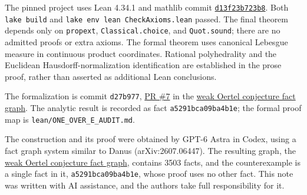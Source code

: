 \documentclass[10pt,letterpaper]{article}
\newcommand{\head}[1]{\vspace{5pt}{\large\bfseries\color{ink}#1}\par}
\begin{document}
The pinned project uses Lean 4.34.1 and mathlib commit
\href{https://github.com/leanprover-community/mathlib4/commit/d13f23b723b8a846827a245b89c10fc7d3f11612}{\texttt{d13f23b723b8}}. Both
\texttt{lake build} and \texttt{lake env lean CheckAxioms.lean} passed.
The final theorem depends only on \texttt{propext}, \texttt{Classical.choice},
and \texttt{Quot.sound}; there are no admitted proofs or extra axioms.
The formal theorem uses canonical Lebesgue measure in continuous product
coordinates. Rational polyhedrality and the Euclidean Hausdorff-normalization
identification are established in the prose proof, rather than asserted as
additional Lean conclusions.

The formalization is commit \texttt{d27b977},
\href{https://github.com/Hongyu-Cheng/weak-oertel-conjecture/pull/7}{PR \#7}
in the \href{https://github.com/Hongyu-Cheng/weak-oertel-conjecture}{weak Oertel conjecture fact graph}.
The analytic result is recorded as fact \texttt{a5291bca09ba4b1e}; the formal
proof map is \texttt{lean/ONE\_OVER\_E\_AUDIT.md}.

\newpage
\head{AI disclosure}
The construction and its proof were obtained by GPT-6 Astra in Codex, using a fact
graph system similar to Danus (arXiv:2607.06447). The resulting graph, the
\href{https://github.com/Hongyu-Cheng/weak-oertel-conjecture}{weak Oertel conjecture fact graph},
contains 3503 facts, and the counterexample is a single fact in it,
\texttt{a5291bca09ba4b1e}, whose proof uses no other fact. This note was written with
AI assistance, and the authors take full responsibility for it.
\end{document}
